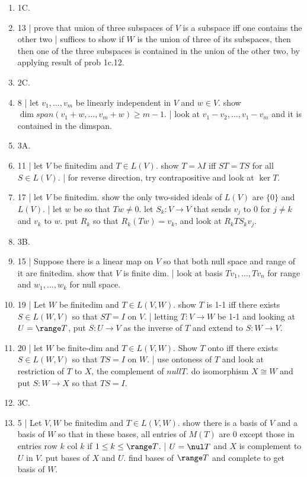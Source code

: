 	\begin{enumerate}
\item 1C. 
	\item 13 | prove that union of three subspaces of $V$ is a subspace iff one contains the other two | suffices to show if $W$ is the union of three of its subspaces, then then one of the three subspaces is contained in the union of the other two, by applying result of prob 1c.12. 
	\item 2C. 
	\item 8 | let $v_1,\dots,v_m$ be linearly independent in $V$ and $w \in V$. show $\dim span(v_1+w,\dots,v_m+w) \geq m-1$. | look at $v_1-v_2,\dots,v_1-v_m$ and it is contained in the dimspan. 
	\item 3A. 
	\item 11 | let $V$ be finitedim and $T \in L(V)$. show $T = \lambda I$ iff $ST=TS$ for all $S \in L(V)$. | for reverse direction, try contrapositive and look at $\ker T$. 
	\item 17 | let $V$ be finitedim. show the only two-sided ideals of $L(V)$ are $\{0\}$ and $L(V)$. | let $w$ be so that $Tw \neq 0$. let $S_k: V \to V$ that sends $v_j$ to 0 for $j \neq k$ and $v_k$ to $w$. put $R_k$ so that $R_k(Tw) = v_k$, and look at $R_kTS_kv_j$. 
	\item 3B. 
	\item 15 | Suppose there is a linear map on $V$ so that both null space and range of it are finitedim. show that $V$ is finite dim. | look at basis $Tv_1,\dots,Tv_n$ for range and $w_1,\dots,w_k$ for null space. 
	\item 19 | Let $W$ be finitedim and $T \in L(V,W)$. show $T$ is 1-1 iff there exists $S \in L(W,V)$ so that $ST=I$ on $V$. | letting $T: V \to W$ be 1-1 and looking at $U=\range T$, put $S: U \to V$ as the inverse of $T$ and extend to $S: W \to V$. 
	\item 20 | let $W$ be finite-dim and $T \in L(V,W)$. Show $T$ onto iff there exists $S \in L(W,V)$ so that $TS=I$ on $W$. | use ontoness of $T$ and look at restriction of $T$ to $X$, the complement of $null T$. do isomorphism $X \cong W$ and put $S: W \to X$ so that $TS=I$. 
	\item 3C. 
	\item 5 | Let $V,W$ be finitedim and $T \in L(V,W)$. show there is a basis of $V$ and a basis of $W$ so that in these bases, all entries of $M(T)$ are 0 except those in entries row $k$ col $k$ if $1 \leq k \leq \range T$. | $U=\nul T$ and $X$ is complement to $U$ in $V$. put bases of $X$ and $U$. find bases of $\range T$ and complete to get basis of $W$. 

\end{enumerate}
